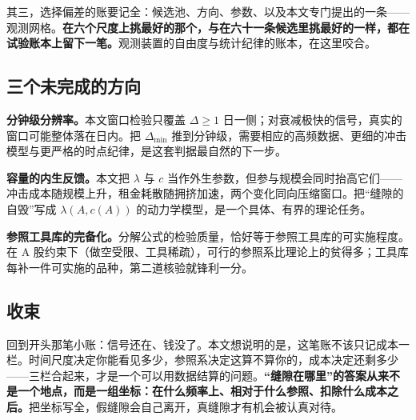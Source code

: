 其三，选择偏差的账要记全：候选池、方向、参数、以及本文专门提出的一条——观测网格。\textbf{在六个尺度上挑最好的那个，与在六十一条候选里挑最好的一样，都在试验账本上留下一笔。}观测装置的自由度与统计纪律的账本，在这里咬合。

\subsection{三个未完成的方向}

\textbf{分钟级分辨率。}本文窗口检验只覆盖 $\Delta\ge1$ 日一侧；对衰减极快的信号，真实的窗口可能整体落在日内。把 $\Delta_{\min}$ 推到分钟级，需要相应的高频数据、更细的冲击模型与更严格的时点纪律，是这套判据最自然的下一步。

\textbf{容量的内生反馈。}本文把 $\lambda$ 与 $c$ 当作外生参数，但参与规模会同时抬高它们——冲击成本随规模上升，租金耗散随拥挤加速，两个变化同向压缩窗口。把“缝隙的自毁”写成 $\lambda(A,c(A))$ 的动力学模型，是一个具体、有界的理论任务。

\textbf{参照工具库的完备化。}分解公式的检验质量，恰好等于参照工具库的可实施程度。在 A 股约束下（做空受限、工具稀疏），可行的参照系比理论上的贫得多；工具库每补一件可实施的品种，第二道核验就锋利一分。

\subsection{收束}

回到开头那笔小账：信号还在、钱没了。本文想说明的是，这笔账不该只记成本一栏。时间尺度决定你能看见多少，参照系决定这算不算你的，成本决定还剩多少——三栏合起来，才是一个可以用数据结算的问题。\textbf{“缝隙在哪里”的答案从来不是一个地点，而是一组坐标：在什么频率上、相对于什么参照、扣除什么成本之后。}把坐标写全，假缝隙会自己离开，真缝隙才有机会被认真对待。